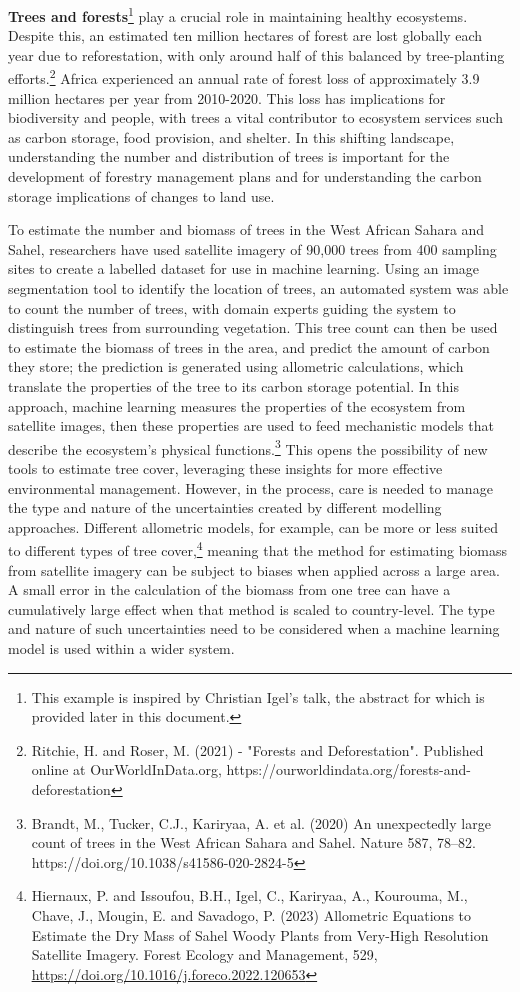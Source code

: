 \textbf{Trees and forests}\footnote{This example is inspired by
  Christian Igel's talk, the abstract for which is provided later in
  this document.} play a crucial role in maintaining healthy ecosystems.
Despite this, an estimated ten million hectares of forest are lost
globally each year due to reforestation, with only around half of this
balanced by tree-planting efforts.\footnote{Ritchie, H. and Roser, M.
  (2021) - "Forests and Deforestation". Published online at
  OurWorldInData.org,
  https://ourworldindata.org/forests-and-deforestation} Africa
experienced an annual rate of forest loss of approximately 3.9 million
hectares per year from 2010-2020. This loss has implications for
biodiversity and people, with trees a vital contributor to ecosystem
services such as carbon storage, food provision, and shelter. In this
shifting landscape, understanding the number and distribution of trees
is important for the development of forestry management plans and for
understanding the carbon storage implications of changes to land use.

To estimate the number and biomass of trees in the West African Sahara
and Sahel, researchers have used satellite imagery of 90,000 trees from
400 sampling sites to create a labelled dataset for use in machine
learning. Using an image segmentation tool to identify the location of
trees, an automated system was able to count the number of trees, with
domain experts guiding the system to distinguish trees from surrounding
vegetation. This tree count can then be used to estimate the biomass of
trees in the area, and predict the amount of carbon they store; the
prediction is generated using allometric calculations, which translate
the properties of the tree to its carbon storage potential. In this
approach, machine learning measures the properties of the ecosystem from
satellite images, then these properties are used to feed mechanistic
models that describe the ecosystem's physical functions.\footnote{Brandt,
  M., Tucker, C.J., Kariryaa, A. et al. (2020) An unexpectedly large
  count of trees in the West African Sahara and Sahel. Nature 587,
  78--82. https://doi.org/10.1038/s41586-020-2824-5} This opens the
possibility of new tools to estimate tree cover, leveraging these
insights for more effective environmental management. However, in the
process, care is needed to manage the type and nature of the
uncertainties created by different modelling approaches. Different
allometric models, for example, can be more or less suited to different
types of tree cover,\footnote{Hiernaux, P. and Issoufou, B.H., Igel, C.,
  Kariryaa, A., Kourouma, M., Chave, J., Mougin, E. and Savadogo, P.
  (2023) Allometric Equations to Estimate the Dry Mass of Sahel Woody
  Plants from Very-High Resolution Satellite Imagery. Forest Ecology and
  Management, 529,
  \href{https://doi.org/10.1016/j.foreco.2022.120653}{\uline{https://doi.org/10.1016/j.foreco.2022.120653}}}
meaning that the method for estimating biomass from satellite imagery
can be subject to biases when applied across a large area. A small error
in the calculation of the biomass from one tree can have a cumulatively
large effect when that method is scaled to country-level. The type and
nature of such uncertainties need to be considered when a machine
learning model is used within a wider system.

